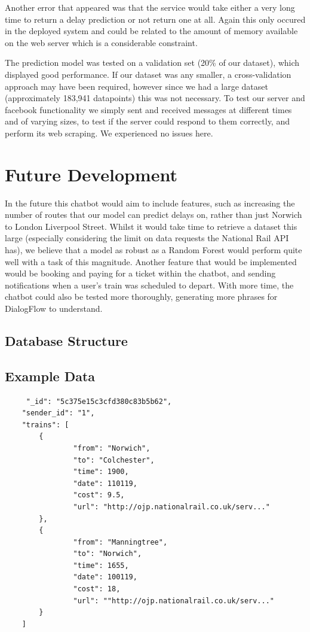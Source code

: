 \documentclass[12pt,a4paper]{article}
\begin{document}
    Another error that appeared was that the service would take either a very long time to return a delay prediction or not return one at all. Again this only occured in the deployed system and could be related to the amount of memory available on the web server which is a considerable constraint.
    
    The prediction model was tested on a validation set (20\% of our dataset), which displayed good performance. If our dataset was any smaller, a cross-validation approach may have been required, however since we had a large dataset (approximately 183,941 datapoints) this was not necessary. To test our server and facebook functionality we simply sent and received messages at different times and of varying sizes, to test if the server could respond to them correctly, and perform its web scraping. We experienced no issues here.

    \section{Future Development}
    In the future this chatbot would aim to include features, such as increasing the number of routes that our model can predict delays on, rather than just Norwich to London Liverpool Street. Whilst it would take time to retrieve a dataset this large (especially considering the limit on data requests the National Rail API has), we believe that a model as robust as a Random Forest would perform quite well with a task of this magnitude. Another feature that would be implemented would be booking and paying for a ticket within the chatbot, and sending notifications when a user's train was scheduled to depart. With more time, the chatbot could also be tested more thoroughly, generating more phrases for DialogFlow to understand.
    
    
    
    
    \begin{appendices}
    \section{Database Structure}
    \label{appendix:db_structure}
    \subsection{Example Data}
    \label{appendix_subsection:db_example_data}
    \begin{lstlisting}
     "_id": "5c375e15c3cfd380c83b5b62",
    "sender_id": "1",
    "trains": [
        {
                "from": "Norwich",
                "to": "Colchester",
                "time": 1900,
                "date": 110119,
                "cost": 9.5,
                "url": "http://ojp.nationalrail.co.uk/serv..."
        },
        {
                "from": "Manningtree",
                "to": "Norwich",
                "time": 1655,
                "date": 100119,
                "cost": 18,
                "url": ""http://ojp.nationalrail.co.uk/serv..."
        }
    ]
    \end{lstlisting}
    \end{appendices}
    
\end{document}
